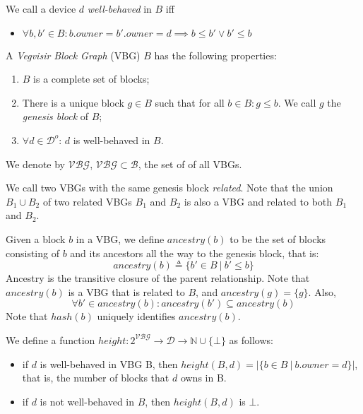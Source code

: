 \documentclass{article}
\begin{document}
We call a device $d$ \emph{well-behaved} in $B$ iff
\begin{itemize}
\item $\forall b, b' \in B: b.\mathit{owner} = b'.\mathit{owner} = d \implies b \leq b' \vee b' \leq b$
\end{itemize}

A \emph{Vegvisir Block Graph} (VBG) $B$ has the following properties:
\begin{enumerate}
\item $B$ is a complete set of blocks;
\item There is a unique block $g \in B$ such that for all $b \in B: g \leq b$.  We call $g$ the \emph{genesis block} of $B$;
\item $\forall d \in \mathcal{D}^o$: $d$ is well-behaved in $B$.
\end{enumerate}
We denote by $\mathcal{VBG}$, $\mathcal{VBG} \subset \mathcal{B}$, the set of of all VBGs.

We call two VBGs with the same genesis block \emph{related}.
Note that the union $B_1 \cup B_2$ of two related VBGs $B_1$ and $B_2$ is also a VBG and
related to both $B_1$ and $B_2$.

Given a block $b$ in a VBG, we define $\mathit{ancestry}(b)$
to be the set of blocks consisting of $b$ and its ancestors all the way to the genesis block, that is:
\begin{equation*}
\mathit{ancestry}(b) \triangleq \{ b' \in B ~|~ b' \leq b \}
\end{equation*}
Ancestry is the transitive closure of the parent relationship.
Note that $\mathit{ancestry}(b)$ is a VBG that is related to $B$, and
$\mathit{ancestry}(g) = \{ g \}$.  Also,
\begin{equation*}
\forall b' \in \mathit{ancestry}(b): \mathit{ancestry}(b') \subseteq \mathit{ancestry}(b)
\end{equation*}
Note that $\mathit{hash}(b)$ uniquely identifies $\mathit{ancestry}(b)$.

We define a function $\mathit{height} : 2^\mathcal{VBG} \rightarrow \mathcal{D} \rightarrow \mathbb{N} \cup \{ \bot \}$
as follows:
\begin{itemize}
\item if $d$ is well-behaved in VBG B, then $\mathit{height}(B, d) = |\{ b \in B ~|~ b.\textit{owner} = d \}|$, that is, the number of blocks that $d$ owns in B.
\item if $d$ is not well-behaved in $B$, then $\mathit{height}(B, d)$ is $\bot$.
\end{itemize}
\end{document}

